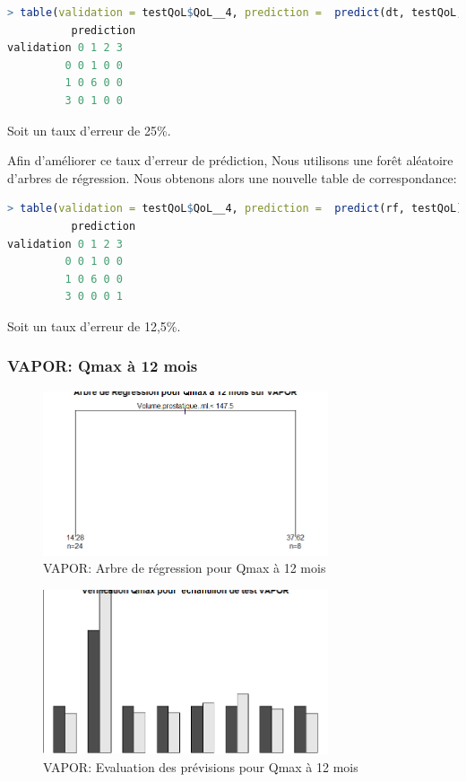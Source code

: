 \begin{lstlisting}[language=R]
> table(validation = testQoL$QoL__4, prediction =  predict(dt, testQoL, type="class"))
          prediction
validation 0 1 2 3
         0 0 1 0 0
         1 0 6 0 0
         3 0 1 0 0
\end{lstlisting}
Soit un taux d'erreur de 25\%.

Afin d'améliorer ce taux d'erreur de prédiction, Nous utilisons une forêt aléatoire d'arbres de régression. Nous obtenons alors une nouvelle table de correspondance:

\begin{lstlisting}[language=R]
> table(validation = testQoL$QoL__4, prediction =  predict(rf, testQoL))
          prediction
validation 0 1 2 3
         0 0 1 0 0
         1 0 6 0 0
         3 0 0 0 1
\end{lstlisting}
Soit un taux d'erreur de 12,5\%.


\subsubsection{VAPOR: Qmax à 12 mois}

\begin{figure}[H]
\centering
\includegraphics[width=0.75\textwidth]{../Fig/VAPOR/vapor-regtree-qmax12.png}
\caption{VAPOR: Arbre de régression pour Qmax à 12 mois}
\label{fig-vapor-regtree-qmax12}
\end{figure}

\begin{figure}[H]
\centering
\includegraphics[width=0.75\textwidth]{../Fig/VAPOR/vapor-regtree-test-qmax12.png}
\caption{VAPOR: Evaluation des prévisions pour Qmax à 12 mois}
\label{fig-vapor-regtree-test-qmax12}
\end{figure}

